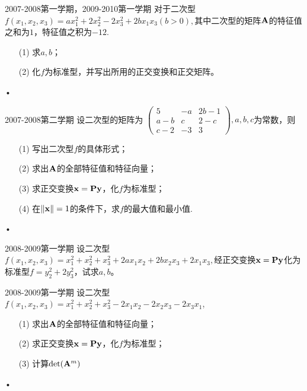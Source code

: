  \begin{frame}
   \begin{footnotesize}
    \begin{exampleblock}{2007-2008第一学期，2009-2010第一学期}
      对于二次型
      $
      f(x_1,x_2,x_3)=ax_1^2+2x_2^2-2x_3^2+2bx_1x_3(b>0),
      $其中二次型的矩阵$\mathbf{A}$的特征值之和为$1$，特征值之积为$-12$.
       \begin{itemize}
\item[(1)] 求$a,b$；
\item[(2)]  化$f$为标准型，并写出所用的正交变换和正交矩阵。
\end{itemize}•
    \end{exampleblock}

   \begin{exampleblock}{2007-2008第二学期}
      设二次型的矩阵为
      $
      \left(
\begin{array}{ccc}
5&-a&2b-1\\
a-b&c&2-c\\
c-2&-3&3
\end{array}
\right), a,b,c
      $为常数，则
\begin{itemize}
\item[(1)] 写出二次型$f$的具体形式；
\item[(2)]  求出$\mathbf{A}$的全部特征值和特征向量；
\item[(3)] 求正交变换$\mathbf{x}=\mathbf{P}\mathbf{y}$，化$f$为标准型；
\item[(4)] 在$\|\mathbf{x}\|=1$的条件下，求$f$的最大值和最小值.
\end{itemize}•
    \end{exampleblock}
  \end{footnotesize}
\end{frame}


 \begin{frame}
   \begin{footnotesize}
    \begin{exampleblock}{2008-2009第一学期}
      设二次型
      $
      f(x_1,x_2,x_3)=x_1^2+x_2^2+x_3^2+2ax_1x_2+2bx_2x_3+2x_1x_3,
      $经正交变换$\mathbf{x}=\mathbf{P}\mathbf{y}$化为标准型$f=y_2^2+2y_3^2$，试求$a,b$。      
    \end{exampleblock}

   \begin{exampleblock}{2008-2009第一学期}
      设二次型$f(x_1,x_2,x_3)=x_1^2+x_2^2+x_3^2-2x_1x_2-2x_2x_3-2x_3x_1$,      
\begin{itemize}
\item[(1)] 求出$\mathbf{A}$的全部特征值和特征向量；
\item[(2)] 求正交变换$\mathbf{x}=\mathbf{P}\mathbf{y}$，化$f$为标准型；
\item[(3)] 计算$\det(\mathbf{A}^m)$
\end{itemize}•
    \end{exampleblock}
  \end{footnotesize}
\end{frame}


